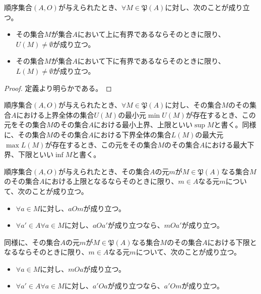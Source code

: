 \documentclass[dvipdfmx]{jsarticle}
\begin{document}
\begin{thm}\label{1.3.1.7}
順序集合$(A,O)$が与えられたとき、$\forall M \in \mathfrak{P}(A)$に対し、次のことが成り立つ。
\begin{itemize}
\item
  その集合$M$が集合$A$において上に有界であるならそのときに限り、$U(M) \neq \emptyset $が成り立つ。
\item
  その集合$M$が集合$A$において下に有界であるならそのときに限り、$L(M) \neq \emptyset $が成り立つ。
\end{itemize}
\end{thm}
\begin{proof}
定義より明らかである。
\end{proof}
\begin{dfn}
順序集合$(A,O)$が与えられたとき、$\forall M \in \mathfrak{P}(A)$に対し、その集合$M$のその集合$A$における上界全体の集合$U(M)$の最小元$\min{U(M)}$が存在するとき、この元をその集合$M$のその集合$A$における最小上界、上限といい$\sup M$と書く。同様に、その集合$M$のその集合$A$における下界全体の集合$L(M)$の最大元$\max{L(M)}$が存在するとき、この元をその集合$M$のその集合$A$における最大下界、下限といい$\inf M$と書く。
\end{dfn}
\begin{thm}\label{1.3.1.8}
順序集合$(A,O)$が与えられたとき、その集合$A$の元$m$が$M \in \mathfrak{P}(A)$なる集合$M$のその集合$A$における上限となるならそのときに限り、$m \in A$なる元$m$について、次のことが成り立つ。
\begin{itemize}
\item
  $\forall a \in M$に対し、$aOm$が成り立つ。
\item
  $\forall a' \in A\forall a \in M$に対し、$aOa'$が成り立つなら、$mOa'$が成り立つ。
\end{itemize}
同様に、その集合$A$の元$m$が$M \in \mathfrak{P}(A)$なる集合$M$のその集合$A$における下限となるならそのときに限り、$m \in A$なる元$m$について、次のことが成り立つ。
\begin{itemize}
\item
  $\forall a \in M$に対し、$mOa$が成り立つ。
\item
  $\forall a' \in A\forall a \in M$に対し、$a'Oa$が成り立つなら、$a'Om$が成り立つ。
\end{itemize}
\end{thm}
\end{document}
